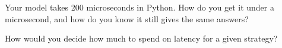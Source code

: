 \begin{interviewq}\label{iq:ml:build-an-order-book-model-end-to-end:5}
Your model takes 200 microseconds in Python. How do you get it under a microsecond, and how do you know it still gives the same
answers?
\end{interviewq}

\begin{interviewq}\label{iq:ml:build-an-order-book-model-end-to-end:6}
How would you decide how much to spend on latency for a given strategy?
\end{interviewq}
